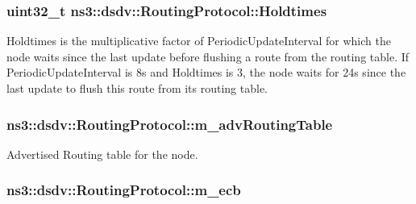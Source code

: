 \subsubsection[{\texorpdfstring{Holdtimes}{Holdtimes}}]{\setlength{\rightskip}{0pt plus 5cm}uint32\+\_\+t ns3\+::dsdv\+::\+Routing\+Protocol\+::\+Holdtimes\hspace{0.3cm}{\ttfamily [private]}}\hypertarget{classns3_1_1dsdv_1_1RoutingProtocol_acdadd6be395f15827ec7c8531797b6e0}{}\label{classns3_1_1dsdv_1_1RoutingProtocol_acdadd6be395f15827ec7c8531797b6e0}
Holdtimes is the multiplicative factor of Periodic\+Update\+Interval for which the node waits since the last update before flushing a route from the routing table. If Periodic\+Update\+Interval is 8s and Holdtimes is 3, the node waits for 24s since the last update to flush this route from its routing table. 
\subsubsection[{\texorpdfstring{m\+\_\+adv\+Routing\+Table}{m_advRoutingTable}}]{ ns3\+::dsdv\+::\+Routing\+Protocol\+::m\+\_\+adv\+Routing\+Table\hspace{0.3cm}{\ttfamily [private]}}\hypertarget{classns3_1_1dsdv_1_1RoutingProtocol_adce3cf63777d6099e58caa1cb198282c}{}\label{classns3_1_1dsdv_1_1RoutingProtocol_adce3cf63777d6099e58caa1cb198282c}


Advertised Routing table for the node. 

\subsubsection[{\texorpdfstring{m\+\_\+ecb}{m_ecb}}]{ ns3\+::dsdv\+::\+Routing\+Protocol\+::m\+\_\+ecb\hspace{0.3cm}{\ttfamily [private]}}\hypertarget{classns3_1_1dsdv_1_1RoutingProtocol_a99588cc0468d174969bd6a66670286ee}{}\label{classns3_1_1dsdv_1_1RoutingProtocol_a99588cc0468d174969bd6a66670286ee}



